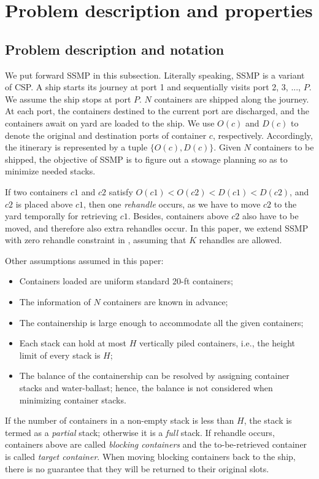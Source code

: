 \documentclass[review,3p,times,authoryear,12pt]{elsarticle}
\begin{document}
\section{Problem description and properties}
\label{sec:pd}
\subsection{Problem description and notation}
We put forward SSMP in this subsection.
Literally speaking, SSMP is a variant of CSP.
A ship starts its journey at port 1 and sequentially visits port 2, 3, ..., $P$. We assume the ship stops at port $P$.
$N$ containers are shipped along the journey.
At each port, the containers destined to the current port are discharged, and the containers await on yard are loaded to the ship.
We use $O(c)$ and $D(c)$ to denote the original and destination ports of container $c$, respectively. Accordingly, the itinerary is represented by a tuple $\{O(c), D(c)\}$.
Given $N$ containers to be shipped, the objective of SSMP is to figure out a stowage planning so as to minimize needed stacks.

If two containers $c1$ and $c2$ satisfy $O(c1)<O(c2)<D(c1)<D(c2)$, and $c2$ is placed above $c1$, then one \textit{rehandle} occurs, as we have to move $c2$ to the yard temporally for retrieving $c1$. Besides, containers above $c2$ also have to be moved, and therefore also extra rehandles occur.
In this paper, we extend SSMP with zero rehandle constraint in \cite{wang2014stowage}, assuming that $K$ rehandles are allowed.



Other assumptions assumed in this paper:
\begin{itemize}
\item Containers loaded are uniform standard 20-ft containers;
\item The information of $N$ containers are known in advance;
\item The containership is large enough to accommodate all the given containers;
\item Each stack can hold at most $H$ vertically piled containers, i.e., the height limit of every stack is $H$;
\item The balance of the containership can be resolved by assigning container stacks and water-ballast; hence, the balance is not considered when minimizing container stacks.
\end{itemize}

If the number of containers in a non-empty stack is less than $H$, the stack is termed as a \textit{partial} stack; otherwise it is a \textit{full} stack.
If rehandle occurs, containers above are called \textit{blocking containers} and the to-be-retrieved container is called \textit{target container}.
When moving blocking containers back to the ship, there is no guarantee that they will be returned to their original slots.
\end{document}
